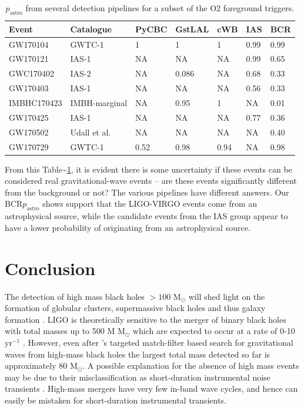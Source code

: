\documentclass[%
preprint,
 amsmath,amssymb,
 aps,
]{revtex4}
\newcommand{\bcr}{{\sc BCR}\xspace}
\newcommand{\msun}{{\sc M${}_\odot$}\xspace}
\begin{document}
\begin{table}
\caption[$p_\text{astro}$ for various O2 foreground triggers]{\label{tab:O2significancesWObcr}$p_\text{astro}$ from several detection pipelines for a subset of the O2 foreground triggers.}
\centering
\begin{tabular}{lllllll} 
\hline
\textbf{Event} & \textbf{Catalogue} & \textbf{PyCBC} & \textbf{GstLAL} & \textbf{cWB} & \textbf{IAS} & \textbf{BCR} \\ 
\hline
GW170104 & GWTC-1 & 1 & 1 & 1 & 0.99 & 0.99 \\
GW170121 & IAS-1 & NA & NA & NA & 0.99 & 0.65 \\
GWC170402 & IAS-2 & NA & 0.086 & NA & 0.68 & 0.33 \\
GW170403 & IAS-1 & NA & NA & NA & 0.56 & 0.33 \\
IMBHC170423 & IMBH-marginal & NA & 0.95 & 1 & NA & 0.01 \\
GW170425 & IAS-1 & NA & NA & NA & 0.77 & 0.36 \\
GW170502 & Udall et al. & NA & NA & NA & NA & 0.40 \\
GW170729 & GWTC-1 & 0.52 & 0.98 & 0.94 & NA & 0.98
\end{tabular}
\end{table}



From this Table\textasciitilde\ref{tab:O2significancesWObcr}, it is evident there is some uncertainty if these events can be considered real gravitational-wave events -- are these events significantly different from the background or not? The various pipelines have different answers. Our \bcr $p_\text{astro}$ shows support that the LIGO-VIRGO events come from an astrophysical source, while the candidate events from the IAS group appear to have a lower probability of originating from an astrophysical source.\\







\section{\label{sec:Conclusion}Conclusion}

The detection of high mass black holes $>100$ \msun will shed light on the formation of globular clusters, supermassive black holes and thus galaxy formation \citep{lodato2006supermassive, 2018IMBHreview}. LIGO is theoretically sensitive to the merger of binary black holes with total masses up to 500 M \msun which are expected to occur at a rate of 0-10 yr\(^{-1}\) \cite{mandel2008rates, fregeau2006imbhbRatePrediction}. However, even after \citet{ligo_imbh_search}'s targeted match-filter based search for gravitational waves from high-mass black holes the largest total mass detected so far is approximately 80 \msun \citep{abbott2019gwtc}. A possible explanation for the absence of high mass events may be due to their misclassification as short-duration instrumental noise transients \citep{blipGlitches}. High-mass mergers have very few in-band wave cycles, and hence can easily be mistaken for short-duration instrumental transients. \\
\end{document}
